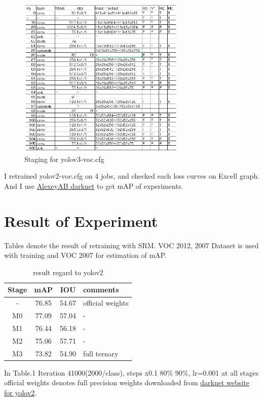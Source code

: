 \documentclass[10pt,a4paper,twocolumn]{article}
\begin{document}
\begin{figure}
\includegraphics[width=8cm]{yolov3-voc_Stages.png}
\caption{Staging for yolov3-voc.cfg}
\end{figure}

I retrained yolov2-voc.cfg on 4 jobs, and checked each loss curves on Excell graph.
And I use \href{https://github.com/AlexeyAB/darknet}{AlexeyAB darknet} to get mAP of experiments.

\section{Result of Experiment}

Tables denote the result of retraining with SRM.
VOC 2012, 2007 Dataset is used with training and VOC 2007 for estimation of mAP.

\begin{table}[htbp]
 \centering
 \begin{tabular}{c|c|c|l}
  Stage & mAP & IOU & comments \\ \hline\hline
  -        & 76.85 & 54.67 & official weights \\ \hline
  M0       & 77.09 & 57.04 & -                \\ \hline
  M1       & 76.44 & 56.18 & -                \\ \hline
  M2       & 75.06 & 57.71 & -                \\ \hline
  M3       & 73.82 & 54.90 & full ternary     \\ \hline\hline
 \end{tabular}
 \caption{result regard to yolov2}
 \label{tb:yolov2}
\end{table}

In Table.1 Iteration 41000(2000/class), steps x0.1 80\% 90\%, lr=0.001 at all stages
official weights denotes full precision weights downloaded from \href{https://pjreddie.com/darknet/yolov2}{darknet website for yolov2}.
\end{document}
